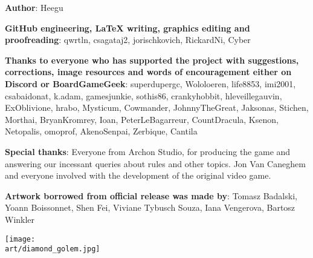 
\bigbreak

\begin{multicols*}{2}

\textbf{Author}: Heegu\par
\textbf{GitHub engineering, LaTeX writing, graphics editing and proofreading}: qwrtln, csagataj2, jorischkovich, RickardNi, Cyber\par
\textbf{Thanks to everyone who has supported the project with suggestions, corrections, image resources and words of encouragement either on Discord or BoardGameGeek}: superdupergc, Wololoeren, life8853, imi2001, csabaidonat, k.adam, gamesjunkie, sothis86, cranky\textunderscore hobbit, hleveillegauvin, ExOblivione, hrabo, Mysticum, Cowmander, JohnnyTheGreat, Jaksonas, Stichen, Morthai, BryanKromrey, Ioan, PeterLeBagarreur, \textunderscore Count\textunderscore Dracula\textunderscore , \space Ksenon, Netopalis, omoprof, AkenoSenpai, Zerbique, Cantila\par
\textbf{Special thanks}: Everyone from Archon Studio, for producing the game and answering our incessant queries about rules and other topics.
Jon Van Caneghem and everyone involved with the development of the original video game.\par
\textbf{Artwork borrowed from official release was made by}: Tomasz Badalski, Yoann Boissonnet, Shen Fei, Viviane Tybusch Souza, Iana Vengerova, Bartosz Winkler

\columnbreak

\texttt{[image: \\art/diamond\_golem.jpg]}

\end{multicols*}
